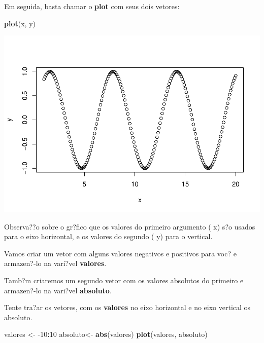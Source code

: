 \documentclass[]{book}
\newenvironment{Shaded}{\begin{snugshade}}{\end{snugshade}}
\newcommand{\DecValTok}[1]{\textcolor[rgb]{0.00,0.00,0.81}{#1}}
\newcommand{\KeywordTok}[1]{\textcolor[rgb]{0.13,0.29,0.53}{\textbf{#1}}}
\newcommand{\NormalTok}[1]{#1}
\newcommand{\OperatorTok}[1]{\textcolor[rgb]{0.81,0.36,0.00}{\textbf{#1}}}
\newcommand{\StringTok}[1]{\textcolor[rgb]{0.31,0.60,0.02}{#1}}
\begin{document}
Em seguida, basta chamar o \textbf{plot} com seus dois vetores:

\begin{Shaded}
\begin{Highlighting}[]
\KeywordTok{plot}\NormalTok{(x, y)}
\end{Highlighting}
\end{Shaded}

\includegraphics{TudodoR_files/figure-latex/unnamed-chunk-46-1.pdf}

Observa??o sobre o gr?fico que os valores do primeiro argumento ( x) s?o usados para o eixo horizontal, e os valores do segundo ( y) para o vertical.

Vamos criar um vetor com alguns valores negativos e positivos para voc? e armazen?-lo na vari?vel \textbf{valores}.

Tamb?m criaremos um segundo vetor com os valores absolutos do primeiro e armazen?-lo na vari?vel \textbf{absoluto}.

Tente tra?ar os vetores, com os \textbf{valores} no eixo horizontal e no eixo vertical os absoluto.

\begin{Shaded}
\begin{Highlighting}[]
\NormalTok{valores <-}\StringTok{ }\DecValTok{-10}\OperatorTok{:}\DecValTok{10}
\NormalTok{absoluto<-}\StringTok{ }\KeywordTok{abs}\NormalTok{(valores)}
\KeywordTok{plot}\NormalTok{(valores, absoluto)}
\end{Highlighting}
\end{Shaded}
\end{document}
